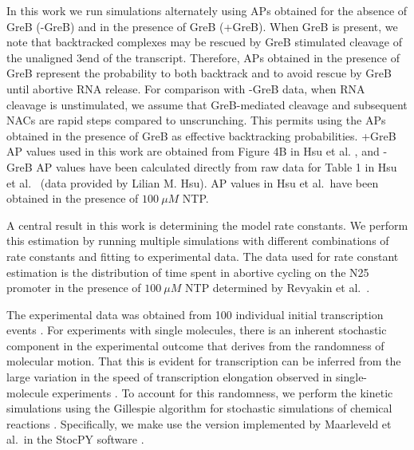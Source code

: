 In this work we run simulations alternately using APs obtained for the
absence of GreB (-GreB) and in the presence of GreB (+GreB). When GreB is
present, we note that backtracked complexes may be rescued by GreB stimulated
cleavage of the unaligned 3\ppp end of the transcript. Therefore, APs obtained
in the presence of GreB represent the probability to both backtrack and to
avoid rescue by GreB until abortive RNA release. For comparison with -GreB
data, when RNA cleavage is unstimulated, we assume that GreB-mediated cleavage
and subsequent NACs are rapid steps compared to unscrunching. This permits
using the APs obtained in the presence of GreB as effective backtracking
probabilities. +GreB AP values used in this work are obtained from Figure 4B
in Hsu et al. \cite{hsu_initial_2006}, and -GreB AP values have been
calculated directly from raw data for Table 1 in Hsu et al.\
\cite{hsu_initial_2006} (data provided by Lilian M. Hsu). AP values in Hsu et
al.\ have been obtained in the presence of $100\ \mu M$ NTP.

A central result in this work is determining the model rate constants. We
perform this estimation by running multiple simulations with different
combinations of rate constants and fitting to experimental data. The data used
for rate constant estimation is the distribution of time spent in abortive
cycling on the N25 promoter in the presence of $100\ \mu M$ NTP determined by
Revyakin et al.\ \cite{revyakin_abortive_2006}.

The experimental data was obtained from 100 individual initial transcription
events \cite{revyakin_abortive_2006}. For experiments with single molecules,
there is an inherent stochastic component in the experimental outcome that
derives from the randomness of molecular motion. That this is evident for
transcription can be inferred from the large variation in the speed of
transcription elongation observed in single-molecule experiments
\cite{adelman_single_2002, tolic-norrelykke_diversity_2004}. To account for
this randomness, we perform the kinetic simulations using the Gillespie
algorithm for stochastic simulations of chemical reactions
\cite{gillespie_exact_1977}. Specifically, we make use the version implemented
by Maarleveld et al.\ in the StocPY software \cite{maarleveld_stochpy:_2013}.


